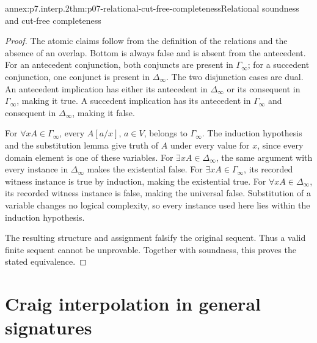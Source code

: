 \begin{annexitem}{annex:p7.interp.2}{thm:p07-relational-cut-free-completeness}{Relational soundness and cut-free completeness}
\begin{proof}
The atomic claims follow from the definition of the relations and
the absence of an overlap.  Bottom is always false and is absent
from the antecedent.  For an antecedent conjunction, both conjuncts
are present in \(\Gamma_\infty\); for a succedent conjunction, one
conjunct is present in \(\Delta_\infty\).  The two disjunction cases
are dual.  An antecedent implication has either its antecedent in
\(\Delta_\infty\) or its consequent in \(\Gamma_\infty\), making it
true.  A succedent implication has its antecedent in \(\Gamma_\infty\)
and consequent in \(\Delta_\infty\), making it false.

For \(\forall xA\in\Gamma_\infty\), every \(A[a/x]\), \(a\in V\),
belongs to \(\Gamma_\infty\).  The induction hypothesis and the
substitution lemma give truth of \(A\) under every value for \(x\),
since every domain element is one of these variables.
For \(\exists xA\in\Delta_\infty\), the same argument with every
instance in \(\Delta_\infty\) makes the existential false.
For \(\exists xA\in\Gamma_\infty\), its recorded witness instance
is true by induction, making the existential true.
For \(\forall xA\in\Delta_\infty\), its recorded witness instance
is false, making the universal false.
Substitution of a variable changes no logical complexity, so every
instance used here lies within the induction hypothesis.

The resulting structure and assignment falsify the original sequent.
Thus a valid finite sequent cannot be unprovable.  Together with
soundness, this proves the stated equivalence.
\end{proof}
\end{annexitem}

\section{Craig interpolation in general signatures}

